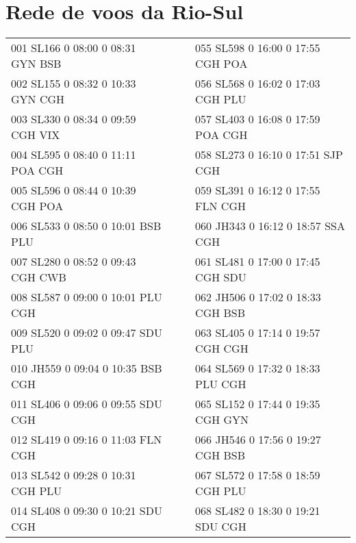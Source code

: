 \chapter{Rede de voos da Rio-Sul}\label{anx:netriosul}


\begin{scriptsize}

\begin{longtable}{l c c l}
001 SL166  0 08:00 0 08:31 GYN BSB & & & 055 SL598  0 16:00 0 17:55 CGH POA \\

002 SL155  0 08:32 0 10:33 GYN CGH & & & 056 SL568  0 16:02 0 17:03 CGH PLU \\

003 SL330  0 08:34 0 09:59 CGH VIX & & & 057 SL403  0 16:08 0 17:59 POA CGH \\

004 SL595  0 08:40 0 11:11 POA CGH & & & 058 SL273  0 16:10 0 17:51 SJP CGH \\

005 SL596  0 08:44 0 10:39 CGH POA & & & 059 SL391  0 16:12 0 17:55 FLN CGH \\

006 SL533  0 08:50 0 10:01 BSB PLU & & & 060 JH343  0 16:12 0 18:57 SSA CGH \\

007 SL280  0 08:52 0 09:43 CGH CWB & & & 061 SL481  0 17:00 0 17:45 CGH SDU \\

008 SL587  0 09:00 0 10:01 PLU CGH & & & 062 JH506  0 17:02 0 18:33 CGH BSB \\

009 SL520  0 09:02 0 09:47 SDU PLU & & & 063 SL405  0 17:14 0 19:57 CGH CGH \\

010 JH559  0 09:04 0 10:35 BSB CGH & & & 064 SL569  0 17:32 0 18:33 PLU CGH \\

011 SL406  0 09:06 0 09:55 SDU CGH & & & 065 SL152  0 17:44 0 19:35 CGH GYN \\

012 SL419  0 09:16 0 11:03 FLN CGH & & & 066 JH546  0 17:56 0 19:27 CGH BSB \\

013 SL542  0 09:28 0 10:31 CGH PLU & & & 067 SL572  0 17:58 0 18:59 CGH PLU \\

014 SL408  0 09:30 0 10:21 SDU CGH & & & 068 SL482  0 18:30 0 19:21 SDU CGH \\


\end{longtable}
\end{scriptsize}
